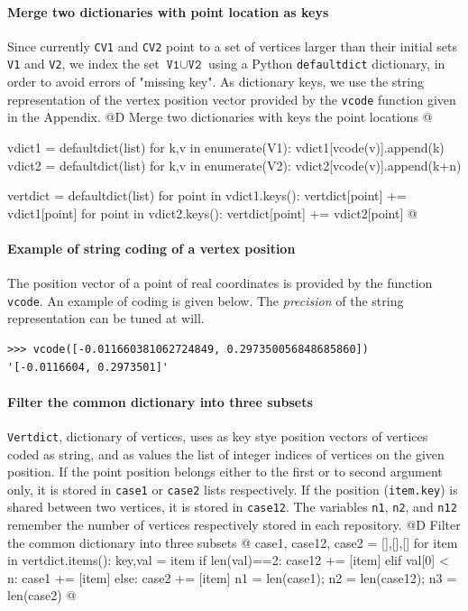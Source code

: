 \documentclass[11pt,oneside]{article}	%
\begin{document}
\paragraph{Merge two dictionaries with point location as keys}
Since currently \texttt{CV1} and \texttt{CV2} point to a set of vertices larger than their initial sets 
\texttt{V1} and \texttt{V2}, we index the set $\texttt{V1} \cup \texttt{V2}$ using a Python \texttt{defaultdict} dictionary, in order to avoid errors of "missing key". As dictionary keys, we use the string representation of the vertex position vector provided by the \texttt{vcode} function given in the Appendix.
@D Merge two dictionaries with keys the point locations
@{	vdict1 = defaultdict(list)
	for k,v in enumerate(V1): vdict1[vcode(v)].append(k) 
	vdict2 = defaultdict(list)
	for k,v in enumerate(V2): vdict2[vcode(v)].append(k+n) 
	
	vertdict = defaultdict(list)
	for point in vdict1.keys(): vertdict[point] += vdict1[point]
	for point in vdict2.keys(): vertdict[point] += vdict2[point]
@}

\paragraph{Example of string coding of a vertex position}
The position vector of a point of real coordinates is provided by the function \texttt{vcode}.
An example of coding is given below. The \emph{precision} of the string representation can be tuned at will.
{\small
\begin{verbatim}
>>> vcode([-0.011660381062724849, 0.297350056848685860])
'[-0.0116604, 0.2973501]'
\end{verbatim}}



\paragraph{Filter the common dictionary into three subsets}
\texttt{Vertdict}, dictionary of vertices, uses as key stye position vectors of vertices coded as string, and as values the list of integer indices of vertices on the given position. If the point position belongs either to the first or to second argument only, it is stored in \texttt{case1} or \texttt{case2} lists respectively. If the position (\texttt{item.key}) is shared between two vertices, it is stored in \texttt{case12}.
The variables \texttt{n1}, \texttt{n2}, and \texttt{n12} remember the number of vertices respectively stored in each repository.
@D Filter the common dictionary into three subsets
@{	case1, case12, case2 = [],[],[]
	for item in vertdict.items():
		key,val = item
		if len(val)==2:  case12 += [item]
		elif val[0] < n: case1 += [item]
		else: case2 += [item]
	n1 = len(case1); n2 = len(case12); n3 = len(case2)
@}
\end{document}
